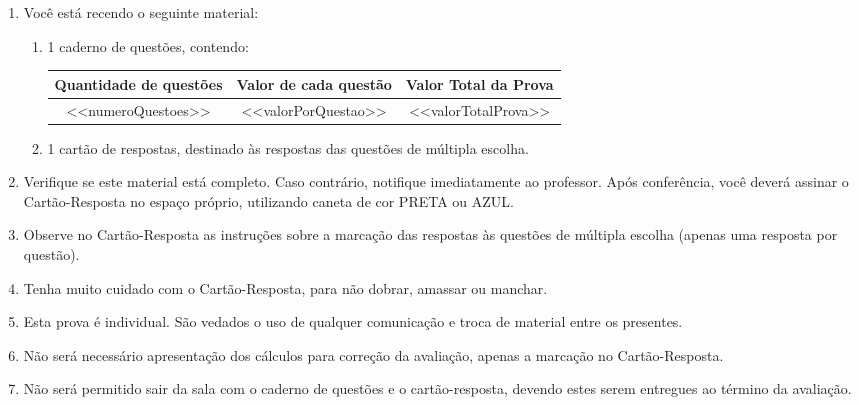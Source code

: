 \documentclass[12pt, a4paper]{article}
\begin{document}
    \begin{enumerate}[label=\bfseries\arabic*. , wide, labelwidth=!, labelindent=0pt, leftmargin=*]
        \item Você está recendo o seguinte material:
        \begin{enumerate}[label=\alph*)]
            \item 1 caderno de questões, contendo: \\
            
            \noindent
            \begin{minipage}{\linewidth}
                \par\centering 
                \begingroup 
                \setlength{\extrarowheight}{3pt} 
                
                \begin{tabular}{|c|c|c|}
                    \hline
                    \rowcolor{lightgray} 
                    \textbf{Quantidade de questões} & \textbf{Valor de cada questão} & \textbf{Valor Total da Prova} \\
                    \hline
                    \rowcolor{white} 
                    <<numeroQuestoes>> & <<valorPorQuestao>> & <<valorTotalProva>> \\
                    \hline
                \end{tabular}
                \endgroup
            \end{minipage}
            \vspace{0.35cm}
            \item 1 cartão de respostas, destinado às respostas das questões de múltipla escolha.
        \end{enumerate}
        \item Verifique se este material está completo. Caso contrário, notifique imediatamente ao professor. 
        Após conferência, você deverá assinar o Cartão-Resposta no espaço próprio, utilizando caneta de cor PRETA ou AZUL.
        \item Observe no Cartão-Resposta as instruções sobre a marcação das respostas às questões de múltipla escolha (apenas uma resposta por questão).
        \item Tenha muito cuidado com o Cartão-Resposta, para não dobrar, amassar ou manchar.
        \item Esta prova é individual. São vedados o uso de qualquer comunicação e troca de material entre os presentes.
        \item Não será necessário apresentação dos cálculos para correção da avaliação, apenas a marcação no Cartão-Resposta.
        \item Não será permitido sair da sala com o caderno de questões e o cartão-resposta, devendo estes serem entregues ao término da avaliação.
    \end{enumerate}
    \vspace{0.5cm}
    \newpage
    
\end{document}
